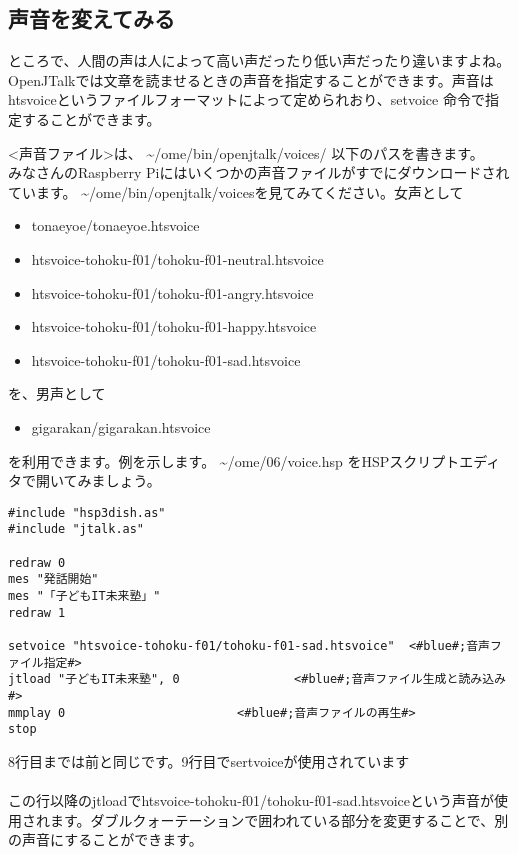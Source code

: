 \subsection{声音を変えてみる}
ところで、人間の声は人によって高い声だったり低い声だったり違いますよね。OpenJTalkでは文章を読ませるときの声音を指定することができます。声音はhtsvoiceというファイルフォーマットによって定められおり、setvoice 命令で指定することができます。\\

<声音ファイル>は、 \textasciitilde /ome/bin/openjtalk/voices/ 以下のパスを書きます。\\
みなさんのRaspberry Piにはいくつかの声音ファイルがすでにダウンロードされています。  \textasciitilde /ome/bin/openjtalk/voicesを見てみてください。女声として
\begin{itemize}
\item tonaeyoe/tonaeyoe.htsvoice
\item htsvoice-tohoku-f01/tohoku-f01-neutral.htsvoice
\item htsvoice-tohoku-f01/tohoku-f01-angry.htsvoice
\item htsvoice-tohoku-f01/tohoku-f01-happy.htsvoice
\item htsvoice-tohoku-f01/tohoku-f01-sad.htsvoice
\end{itemize}
を、男声として
\begin{itemize}
\item gigarakan/gigarakan.htsvoice
\end{itemize}
を利用できます。例を示します。 \textasciitilde /ome/06/voice.hsp をHSPスクリプトエディタで開いてみましょう。\\

\begin{lstlisting}[caption=voice.hsp,label=voice.hsp]
#include "hsp3dish.as"
#include "jtalk.as"

redraw 0
mes "発話開始"
mes "「子どもIT未来塾」"
redraw 1

setvoice "htsvoice-tohoku-f01/tohoku-f01-sad.htsvoice"	<#blue#;音声ファイル指定#>
jtload "子どもIT未来塾", 0				<#blue#;音声ファイル生成と読み込み#>
mmplay 0						<#blue#;音声ファイルの再生#>
stop
\end{lstlisting}

8行目までは前と同じです。9行目でsertvoiceが使用されています\\
\\
この行以降のjtloadでhtsvoice-tohoku-f01/tohoku-f01-sad.htsvoiceという声音が使用されます。ダブルクォーテーションで囲われている部分を変更することで、別の声音にすることができます。\\

